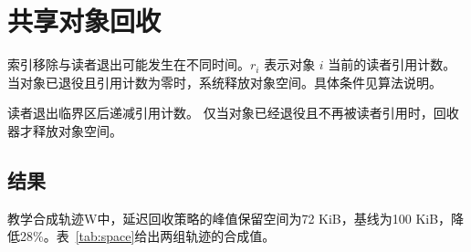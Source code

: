 \chapter{共享对象回收}
\label{ch:reclaim}
索引移除与读者退出可能发生在不同时间。$r_i$ 表示对象 $i$ 当前的读者引用计数。当对象已退役且引用计数为零时，系统释放对象空间。具体条件见算法说明。

读者退出临界区后递减引用计数。
仅当对象已经退役且不再被读者引用时，回收器才释放对象空间。
\section{结果}
教学合成轨迹W中，延迟回收策略的峰值保留空间为72 KiB，基线为100 KiB，降低28\%。表~\ref{tab:space}给出两组轨迹的合成值。

